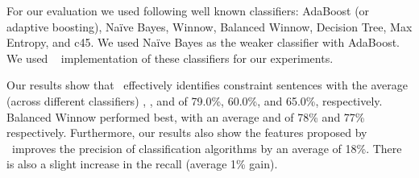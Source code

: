 For our evaluation we used following well known classifiers: AdaBoost (or adaptive boosting), Na{\"i}ve Bayes, Winnow, Balanced Winnow, Decision Tree, Max Entropy, and c45. We used Na{\"i}ve Bayes as the weaker classifier with AdaBoost. We used ~\cite{mallet} implementation of these classifiers for our experiments.

Our results show that \tool\ effectively identifies constraint sentences with the average (across different classifiers) , , and  of 79.0\%, 60.0\%, and 65.0\%, respectively.
Balanced Winnow performed best, with an average  and  of 78\% and 77\% respectively. 
Furthermore, our results also show the features proposed by \tool\ improves the precision of classification algorithms by an average of 18\%. There is also a slight increase in the recall (average 1\% gain). 

 

%
%
%
%
 
